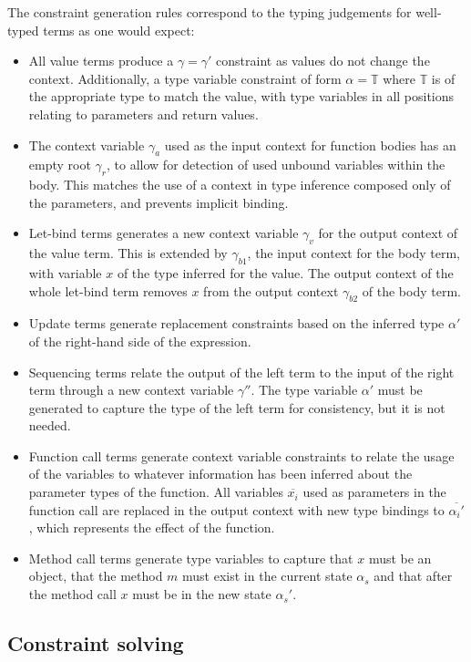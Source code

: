 \documentclass[preprint]{sigplanconf}
\newcommand{\tinf}{\mathbb{T}}
\begin{document}
The constraint generation rules correspond to the typing judgements for 
well-typed terms as one would expect:

\begin{itemize}
\item All value terms produce a $\gamma = \gamma'$ constraint as values do
not change the context. Additionally, a type variable constraint of form
$\alpha = \tinf$ where $\tinf$ is of the appropriate type to match
the value, with type variables in all positions relating to parameters and return
values.
\item The context variable $\gamma_a$ used as the input context for
function bodies has an empty root $\gamma_r$, to allow for detection of 
used unbound variables within
the body. This matches the use of a context in type inference
composed only of the parameters, and prevents implicit binding.
\item Let-bind terms generates a new context variable $\gamma_v$ for the
output context of the value term. This is extended by $\gamma_{b1}$, the
input context for the body term, with variable $x$ of the type inferred
for the value. The output context of the whole let-bind term removes
$x$ from the output context $\gamma_{b2}$ of the body term.
\item Update terms generate replacement constraints based on the inferred
type $\alpha'$ of the right-hand side of the expression.
\item Sequencing terms relate the output of the left term to the input of the
right term through a new context variable $\gamma''$. The type variable
$\alpha'$ must be generated to capture the type of the left term for
consistency, but it is not needed.
\item Function call terms generate context variable constraints to relate the
usage of the variables to whatever information has been inferred about the
parameter types of the function. All variables $\overline{x_i}$ used as 
parameters in the function call are replaced in the output context with
new type bindings to $\overline{\alpha_i'}$, which represents the effect
of the function.
\item Method call terms generate type variables to capture that $x$ must
be an object, that the method $m$ must exist in the current state $\alpha_s$
and that after the method call $x$ must be in the new state $\alpha_s'$.
\end{itemize}

\subsection{Constraint solving}
\end{document}
